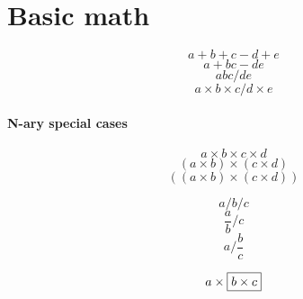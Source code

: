 \documentclass{article}
\begin{document}
%
%
%
%
%

\section{Basic math}
\[ a + b + c - d + e \]
\[ a + b c - d  e \]
\[ a b c / d e \]
\[ a \times b \times c / d \times e \]

\paragraph{N-ary special cases}
\[ a \times b \times c \times d \]
\[ (a \times b) \times (c \times d) \]
\[ ((a \times b) \times (c \times d)) \]

\[ a / b / c \]
\[ \frac{a}{b} / c \]
\[ a / \frac{b}{c} \]

\[ a \times \fbox{$b \times c$}\]
\end{document}
